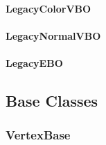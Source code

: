 \documentclass[a4paper,10pt,english,openany,oneside]{sphinxmanual}
\begin{document}
\paragraph{LegacyColorVBO}
\label{\detokenize{api/buffers:legacycolorvbo}}

\paragraph{LegacyNormalVBO}
\label{\detokenize{api/buffers:legacynormalvbo}}

\paragraph{LegacyEBO}
\label{\detokenize{api/buffers:legacyebo}}

\subsection{Base Classes}
\label{\detokenize{api/buffers:base-classes}}

\subsubsection{VertexBase}
\label{\detokenize{api/buffers:vertexbase}}
\end{document}
